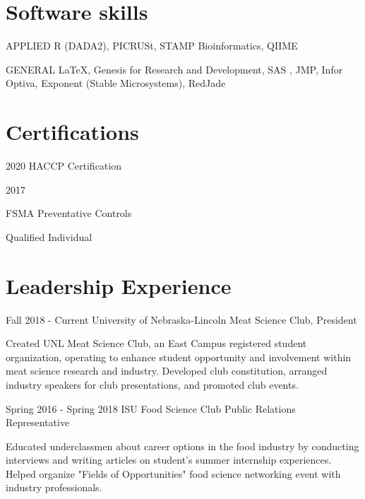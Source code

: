 \documentclass{tccv}
\begin{document}
\section{Software skills}

\begin{factlist}

\item{APPLIED}
     {R (DADA2), PICRUSt, STAMP Bioinformatics, QIIME}

\item{GENERAL}
     { \LaTeX, Genesis for Research and Development, SAS , JMP, Infor Optiva, Exponent (Stable Microsystems), RedJade}


\end{factlist}


\section{Certifications}
\begin{yearlist}

\item{2020}
    {HACCP Certification}

\item{2017}
     {FSMA Preventative Controls

     Qualified Individual}



\end{yearlist}

\vspace{500}
\section{Leadership Experience}
\begin{eventlist}

\item{Fall 2018 - Current}
     {University of Nebraska-Lincoln}
     {Meat Science Club, President}

Created UNL Meat Science Club, an East Campus registered student organization, operating to enhance student opportunity and involvement within meat science research and industry. Developed club constitution, arranged industry speakers for club presentations, and promoted club events.

\item{Spring 2016 - Spring 2018}
     {ISU Food Science Club}
     {Public Relations Representative}

Educated underclassmen about career options in the food industry by conducting interviews and writing articles on  student's summer internship experiences. Helped organize "Fields of Opportunities" food science networking event with industry professionals.
\end{eventlist}
\end{document}
